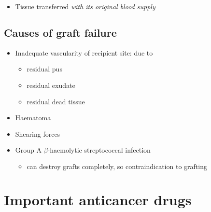 \documentclass[
  12pt,
]{memoir}
\providecommand{\tightlist}{%
  \setlength{\itemsep}{0pt}\setlength{\parskip}{0pt}}
\begin{document}
\begin{itemize}
\tightlist
\item
  Tissue transferred \emph{with its original blood supply}
\end{itemize}

\hypertarget{causes-of-graft-failure}{%
\section{Causes of graft failure}\label{causes-of-graft-failure}}

\begin{itemize}
\tightlist
\item
  Inadequate vascularity of recipient site: due to

  \begin{itemize}
  \tightlist
  \item
    residual pus
  \item
    residual exudate
  \item
    residual dead tissue
  \end{itemize}
\item
  Haematoma
\item
  Shearing forces
\item
  Group A \(\beta\)-haemolytic streptococcal infection

  \begin{itemize}
  \tightlist
  \item
    can destroy grafts completely, so contraindication to grafting
  \end{itemize}
\end{itemize}

\pagebreak

\hypertarget{important-anticancer-drugs}{%
\chapter{Important anticancer drugs}\label{important-anticancer-drugs}}
\end{document}
